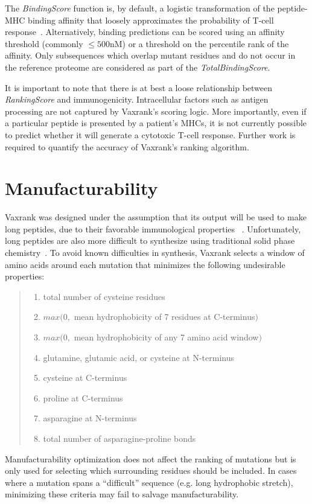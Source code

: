 \documentclass[10pt,letterpaper]{article}
\begin{document}
The {\it BindingScore} function is, by default, a logistic transformation of the peptide-MHC binding affinity that loosely approximates the probability of T-cell response~\citep{Sette1994}. Alternatively, binding predictions can be scored using an affinity threshold (commonly $\leq 500$nM) or a threshold on the percentile rank of the affinity. Only subsequences which overlap mutant residues and do not occur in the reference proteome are considered as part of the {\it TotalBindingScore}.

It is important to note that there is at best a loose relationship between {\it RankingScore} and immunogenicity. Intracellular factors such as antigen processing are not captured by Vaxrank's scoring logic. More importantly, even if a particular peptide is presented by a patient's MHCs, it is not currently possible to predict whether it will generate a cytotoxic T-cell response. Further work is required to quantify the accuracy of Vaxrank's ranking algorithm.

\section{Manufacturability}
Vaxrank was designed under the assumption that its output will be used to make long peptides, due to their favorable immunological properties ~\citep{synthetic-long-peptides}. Unfortunately, long peptides are also more difficult to synthesize using traditional solid phase chemistry~\citep{PeptideChemistry}. To avoid known difficulties in synthesis, Vaxrank selects a window of amino acids around each mutation that minimizes the following undesirable properties:

\begin{quote}
\begin{enumerate}
    \item total number of cysteine residues
    \item $max(0, $ mean hydrophobicity of 7 residues at C-terminus$)$
    \item $max(0, $ mean hydrophobicity of any 7 amino acid window$)$
    \item glutamine, glutamic acid, or cysteine at N-terminus
    \item cysteine at C-terminus
    \item proline at C-terminus
    \item asparagine at N-terminus
    \item total number of asparagine-proline bonds
\end{enumerate}
\end{quote}
Manufacturability optimization does not affect the ranking of mutations but is only used for selecting which surrounding residues should be included.  In cases where a mutation  spans a ``difficult'' sequence (e.g. long hydrophobic stretch), minimizing these criteria  may fail to salvage manufacturability.
\end{document}
